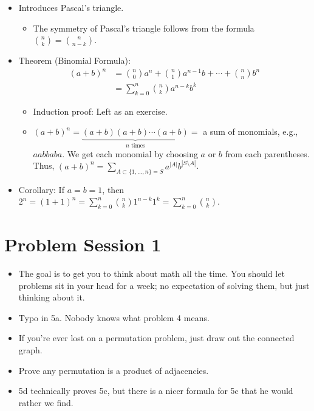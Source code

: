 \documentclass[../main.tex]{subfiles}
\begin{document}
\begin{itemize}
\begin{itemize}
    \end{itemize}
    \item Introduces Pascal's triangle.
    \begin{itemize}
        \item The symmetry of Pascal's triangle follows from the formula $\binom{n}{k}=\binom{n}{n-k}$.
    \end{itemize}
    \item Theorem (Binomial Formula):
    \begin{align*}
        (a+b)^n &= \binom{n}{0}a^n+\binom{n}{1}a^{n-1}b+\cdots+\binom{n}{n}b^n\\
        &= \sum_{k=0}^n\binom{n}{k}a^{n-k}b^k
    \end{align*}
    \begin{itemize}
        \item Induction proof: Left as an exercise.
        \item $(a+b)^n=\underbrace{(a+b)(a+b)\cdots(a+b)}_{n\text{ times}}=$ a sum of monomials, e.g., $aabbaba$. We get each monomial by choosing $a$ or $b$ from each parentheses. Thus, $(a+b)^n=\sum_{A\subset\{1,\dots,n\}=S}a^{|A|}b^{|S\setminus A|}$.
    \end{itemize}
    \item Corollary: If $a=b=1$, then $2^n=(1+1)^n=\sum_{k=0}^n\binom{n}{k}1^{n-k}1^k=\sum_{k=0}^n\binom{n}{k}$.
\end{itemize}



\section{Problem Session 1}
\begin{itemize}
    \item {}The goal is to get you to think about math all the time. You should let problems sit in your head for a week; no expectation of solving them, but just thinking about it.
    \item Typo in 5a. Nobody knows what problem 4 means.
    \item If you're ever lost on a permutation problem, just draw out the connected graph.
    \item Prove any permutation is a product of adjacencies.
    \item 5d technically proves 5c, but there is a nicer formula for 5c that he would rather we find.
\end{itemize}
\end{document}
